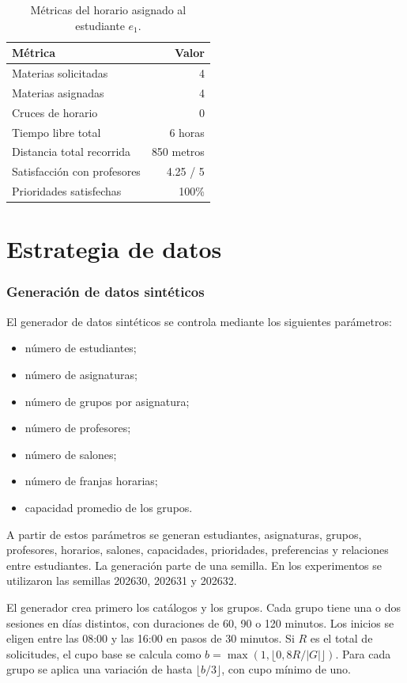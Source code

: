 \documentclass[11pt]{article}
\numberwithin{equation}{section}
\numberwithin{figure}{section}
\numberwithin{table}{section}
\theoremstyle{definition}
\begin{document}
\begin{table}[H]
\centering
\caption{Métricas del horario asignado al estudiante $e_1$.}
\begin{tabular}{lr}
\toprule
\textbf{Métrica} & \textbf{Valor} \\
\midrule
Materias solicitadas        & 4 \\
Materias asignadas          & 4 \\
Cruces de horario           & 0 \\
Tiempo libre total          & 6 horas \\
Distancia total recorrida   & 850 metros \\
Satisfacción con profesores & 4.25 / 5 \\
Prioridades satisfechas     & 100\% \\
\bottomrule
\end{tabular}
\end{table}

\part{Estrategia de datos}

\section{Generación de datos sintéticos}

El generador de datos sintéticos se controla mediante los siguientes
parámetros:

\begin{itemize}
  \item número de estudiantes;
  \item número de asignaturas;
  \item número de grupos por asignatura;
  \item número de profesores;
  \item número de salones;
  \item número de franjas horarias;
  \item capacidad promedio de los grupos.
\end{itemize}

A partir de estos parámetros se generan estudiantes, asignaturas, grupos,
profesores, horarios, salones, capacidades, prioridades, preferencias y
relaciones entre estudiantes. La generación parte de una semilla. En los
experimentos se utilizaron las semillas 202630, 202631 y 202632.

El generador crea primero los catálogos y los grupos. Cada grupo tiene
una o dos sesiones en días distintos, con duraciones de 60, 90 o 120
minutos. Los inicios se eligen entre las 08:00 y las 16:00 en pasos de
30 minutos. Si $R$ es el total de solicitudes, el cupo base se calcula
como $b=\max(1,\lfloor 0{,}8R/|G|\rfloor)$. Para cada grupo se aplica
una variación de hasta $\lfloor b/3\rfloor$, con cupo mínimo de uno.
\end{document}
